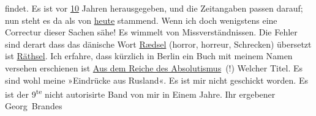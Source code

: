                findet. Es ist vor \uline{10} Jahren herausgegeben, und die
               Zeitangaben passen darauf; nun steht es da als von \uline{heute} stammend. Wenn ich doch wenigstens eine Correctur dieser Sachen sähe!
               Es wimmelt von Missverständnissen. Die Fehler sind derart dass das dänische Wort \uline{Rædsel} (horror, horreur, Schrecken) übersetzt ist \uline{Räthsel}.\hspace*{5em} Ich erfahre, dass kürzlich in
                  Berlin ein Buch mit meinem Namen versehen
               erschienen ist \uline{Aus dem Reiche des Absolutismus} (!) Welcher Titel. Es sind wohl meine »Eindrücke aus Rusland«. Es ist mir nicht geschickt worden. \introOben{}Es ist der 9\textsuperscript{te} nicht autorisirte Band
                  von mir in Einem Jahre.\introOben{}\pend
           \pstart Ihr ergebener \spacefill\mbox{Georg Brandes}\pend{}\endnumbering{}  \newcommand{\dateiname}{L00600}\newcommand{\titel}{Georg Brandes an Arthur Schnitzler, 6. 10. 1896}\newcommand{\editorInnen}{Martin Anton Müller und Gerd-Hermann Susen}
